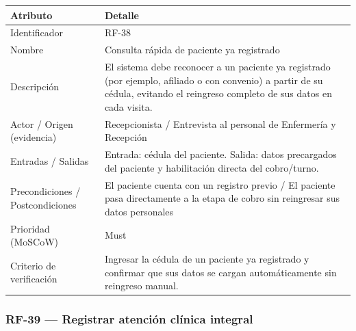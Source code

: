 \documentclass[11pt,a4paper]{article}
\begin{document}
	\begin{longtable}{p{} p{}}
		
		\toprule
		\textbf{Atributo} & \textbf{Detalle} \\
		\midrule
		\endhead
		
		Identificador & RF-38  \\
		Nombre & Consulta rápida de paciente ya registrado \\
		Descripción & El sistema debe reconocer a un paciente ya registrado (por ejemplo, afiliado o con convenio) a partir de su cédula, evitando el reingreso completo de sus datos en cada visita. \\
		Actor / Origen (evidencia) & Recepcionista / Entrevista al personal de Enfermería y Recepción \\
		Entradas / Salidas & Entrada: cédula del paciente. Salida: datos precargados del paciente y habilitación directa del cobro/turno. \\
		Precondiciones / Postcondiciones & El paciente cuenta con un registro previo / El paciente pasa directamente a la etapa de cobro sin reingresar sus datos personales \\
		Prioridad (MoSCoW) & Must \\
		Criterio de verificación & Ingresar la cédula de un paciente ya registrado y confirmar que sus datos se cargan automáticamente sin reingreso manual. \\
		\bottomrule
		
	\end{longtable}
	
	\subsubsection{RF-39 --- Registrar atención clínica integral}
	
\end{document}
